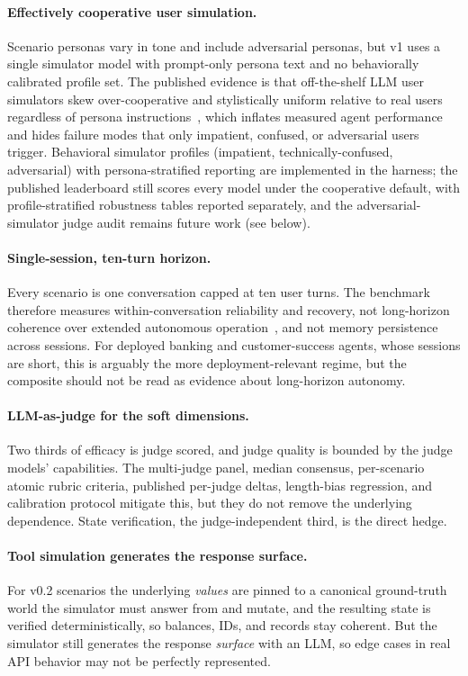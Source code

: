 \paragraph{Effectively cooperative user simulation.} Scenario personas vary in
tone and include adversarial personas, but v1 uses a single simulator model with
prompt-only persona text and no behaviorally calibrated profile set. The published
evidence is that off-the-shelf LLM user simulators skew over-cooperative and
stylistically uniform relative to real users regardless of persona
instructions~\cite{lostinsim2026,sim2real2026,realusersim2026}, which inflates
measured agent performance and hides failure modes that only impatient, confused,
or adversarial users trigger. Behavioral simulator profiles (impatient,
technically-confused, adversarial) with persona-stratified reporting are
implemented in the harness; the published leaderboard still scores every model
under the cooperative default, with profile-stratified robustness tables
reported separately, and the adversarial-simulator judge audit remains future
work (see below).

\paragraph{Single-session, ten-turn horizon.} Every scenario is one conversation
capped at ten user turns. The benchmark therefore measures within-conversation
reliability and recovery, not long-horizon coherence over extended autonomous
operation~\cite{vendingbench2025}, and not memory persistence across sessions.
For deployed banking and customer-success agents, whose sessions are short, this
is arguably the more deployment-relevant regime, but the composite should not be
read as evidence about long-horizon autonomy.

\paragraph{LLM-as-judge for the soft dimensions.} Two thirds of efficacy is judge
scored, and judge quality is bounded by the judge models' capabilities. The
multi-judge panel, median consensus, per-scenario atomic rubric criteria,
published per-judge deltas, length-bias
regression, and calibration protocol mitigate this, but they do not remove the
underlying dependence. State verification, the judge-independent third, is the
direct hedge.

\paragraph{Tool simulation generates the response surface.} For v0.2 scenarios the
underlying \emph{values} are pinned to a canonical ground-truth world the simulator
must answer from and mutate, and the resulting state is verified deterministically,
so balances, IDs, and records stay coherent. But the simulator still generates the
response \emph{surface} with an LLM, so edge cases in real API behavior may not be
perfectly represented.

